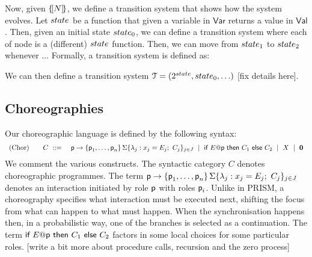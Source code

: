 Now, given $\{\![N]\!\}$, we define a transition system that shows how the
system evolves.  Let $\state$ be a function that given a variable in
$\mathsf{Var}$ returns a value in $\mathsf{Val}$. Then, given an
initial state $\state_0$, we can define a transition system where each
of node is a (different) $\state$ function. Then, we can move from
$\state_1$ to $\state_2$ whenever ... Formally, a transition system is
defined as:
\begin{definition}
\end{definition}
We can then define a transition system
$\mathcal T = (2^\state,\state_0,\ldots)$ [fix details here].






\newpage


\subsection{Choreographies}

 Our choreographic language is defined by the following
syntax:
%
\begin{displaymath}
  \begin{array}{lll}
    \text{(Chor)}
    \quad & C \ ::=\
    &
      \textsf{p}\rightarrow \{\textsf{p}_1,\ldots,\textsf{p}_n\}\,\Sigma\{\lambda_j: x_j=E_j;\ C_j\}_{j\in J}
      \ \mid\
      \textsf{if } E@\textsf{p} \textsf{ then } {C_1} \textsf{ else } {C_2}
      \ \mid\
      X
      \ \mid\
      \mathbf{0}
  \end{array}
\end{displaymath}
We comment the various constructs. The syntactic category $C$ denotes
choreographic programmes. The term
$\textsf{p}\rightarrow \{\textsf{p}_1,\ldots,\textsf{p}_n\}\,\Sigma\{\lambda_j:
x_j=E_j;\ C_j\}_{j\in J}$ denotes an interaction initiated by role
$\textsf{p}$ with roles $\textsf{p}_i$. Unlike in PRISM, a choreography
specifies what interaction must be executed next, shifting the focus
from what can happen to what must happen. When the synchronisation
happens then, in a probabilistic way, one of the branches is selected
as a continuation. The term
$\textsf{if } E@\textsf{p} \textsf{ then } C_1 \textsf{
  else } C_2$ factors in some local choices for some particular
roles. [write a bit more about procedure calls, recursion and the zero
process]


